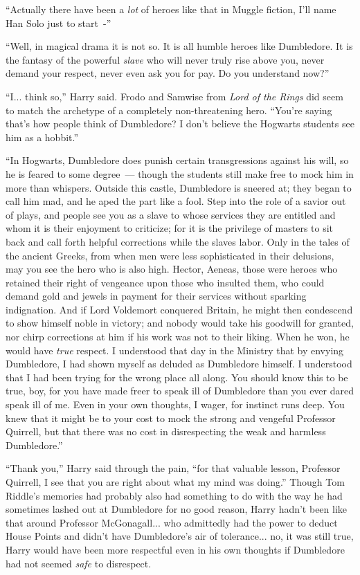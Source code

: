``Actually there have been a \emph{lot} of heroes like that in Muggle fiction, I'll name Han Solo just to start~-''

``Well, in magical drama it is not so. It is all humble heroes like Dumbledore. It is the fantasy of the powerful \emph{slave} who will never truly rise above you, never demand your respect, never even ask you for pay. Do you understand now?''

``I... think so,'' Harry said. Frodo and Samwise from \emph{Lord of the Rings} did seem to match the archetype of a completely non-threatening hero. ``You're saying that's how people think of Dumbledore? I don't believe the Hogwarts students see him as a hobbit.''

``In Hogwarts, Dumbledore does punish certain transgressions against his will, so he is feared to some degree~--- though the students still make free to mock him in more than whispers. Outside this castle, Dumbledore is sneered at; they began to call him mad, and he aped the part like a fool. Step into the role of a savior out of plays, and people see you as a slave to whose services they are entitled and whom it is their enjoyment to criticize; for it is the privilege of masters to sit back and call forth helpful corrections while the slaves labor. Only in the tales of the ancient Greeks, from when men were less sophisticated in their delusions, may you see the hero who is also high. Hector, Aeneas, those were heroes who retained their right of vengeance upon those who insulted them, who could demand gold and jewels in payment for their services without sparking indignation. And if Lord Voldemort conquered Britain, he might then condescend to show himself noble in victory; and nobody would take his goodwill for granted, nor chirp corrections at him if his work was not to their liking. When he won, he would have \emph{true} respect. I understood that day in the Ministry that by envying Dumbledore, I had shown myself as deluded as Dumbledore himself. I understood that I had been trying for the wrong place all along. You should know this to be true, boy, for you have made freer to speak ill of Dumbledore than you ever dared speak ill of me. Even in your own thoughts, I wager, for instinct runs deep. You knew that it might be to your cost to mock the strong and vengeful Professor Quirrell, but that there was no cost in disrespecting the weak and harmless Dumbledore.''

``Thank you,'' Harry said through the pain, ``for that valuable lesson, Professor Quirrell, I see that you are right about what my mind was doing.'' Though Tom Riddle's memories had probably also had something to do with the way he had sometimes lashed out at Dumbledore for no good reason, Harry hadn't been like that around Professor McGonagall... who admittedly had the power to deduct House Points and didn't have Dumbledore's air of tolerance... no, it was still true, Harry would have been more respectful even in his own thoughts if Dumbledore had not seemed \emph{safe} to disrespect.

